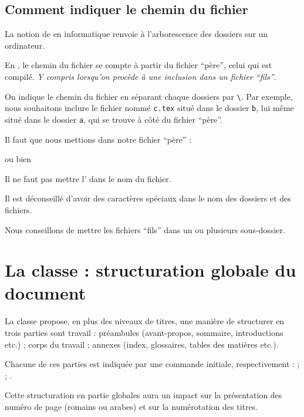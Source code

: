 \subsection{Comment indiquer le chemin du fichier}

La notion de  en informatique renvoie à l'arborescence des dossiers sur un ordinateur.

En \logiciel{\LaTeX}, le chemin du fichier se compte à partir du fichier \enquote{père}, celui qui est compilé. \emph{Y compris lorsqu'on procède à une inclusion dans un fichier \enquote{fils}}.

On indique le chemin du fichier en séparant chaque dossiers par \verb|\|.  Par exemple, nous souhaitons inclure le fichier nommé \verb|c.tex| situé dans le dossier \verb|b|, lui même situé dans le dossier \verb|a|, qui se trouve à côté du fichier \enquote{père}.

Il faut que nous mettions dans notre fichier \enquote{père} :

\verb||

ou bien

\verb||

\begin{attention}

Il ne faut pas mettre l'  dans le nom du fichier.

Il est déconseillé d'avoir des caractères spéciaux dans le nom des dossiers et des fichiers.
\end{attention}

Nous conseillons de mettre les fichiers \enquote{fils} dans un ou plusieurs sous-dossier.

\section{La classe  : structuration globale du document}

La classe  propose, en plus des niveaux de titres, une manière de structurer en trois parties sont travail : préambules (avant-propos, sommaire, introductions etc.) ; corps du travail ; annexes (index, glossaires, tables des matières etc.). 

Chacune de ces parties est indiquée par une commande initiale, respectivement : \commande{\frontmatter} ; \commande{\mainmatter} ; \commande{\backmatter}.

Cette structuration en partie globales aura un impact sur la présentation des numéro de page (romains ou arabes) et sur la numérotation des titres.

 
